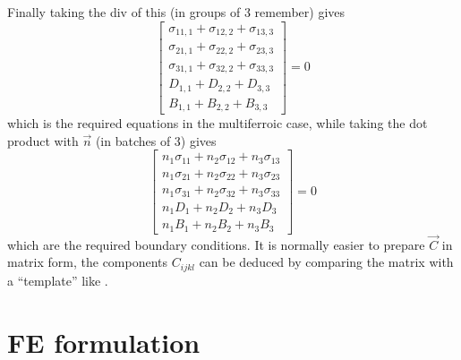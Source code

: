 \documentclass[a4paper]{article}
\begin{document}
Finally taking the div of this (in groups of 3 remember) gives
\begin{equation}
  \left[\begin{array}{c}
    \sigma_{11,1}+\sigma_{12,2}+\sigma_{13,3}\\
    \sigma_{21,1}+\sigma_{22,2}+\sigma_{23,3}\\
    \sigma_{31,1}+\sigma_{32,2}+\sigma_{33,3}\\
    D_{1,1}+D_{2,2}+D_{3,3}\\
    B_{1,1}+B_{2,2}+B_{3,3}
  \end{array}\right]
=0
\end{equation}
which is the required equations in the multiferroic case, while taking the dot
product with $\vec n$ (in batches of 3) gives
\begin{equation}
  \left[\begin{array}{c}
    n_1\sigma_{11}+n_2\sigma_{12}+n_3\sigma_{13}\\
    n_1\sigma_{21}+n_2\sigma_{22}+n_3\sigma_{23}\\
    n_1\sigma_{31}+n_2\sigma_{32}+n_3\sigma_{33}\\
    n_1 D_1+n_2 D_2+n_3 D_3\\
    n_1 B_1+n_2 B_2+n_3 B_3
  \end{array}\right]=0
\end{equation}
which are the required boundary conditions. It
is normally easier to prepare $\vec C$ in matrix form, the components
$C_{ijkl}$ can be deduced by comparing the matrix with a ``template'' like .

\section{FE formulation}
\label{formulation}
\end{document}
